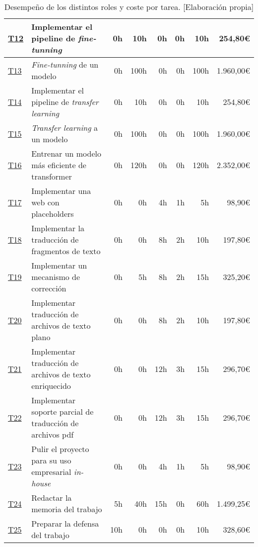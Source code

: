 \begin{landscape}
\begin{table}
\begin{tabular}{  l  l  r  r  r  r  r  r  }
        \hline
        \hyperref[T12]{T12} & Implementar el pipeline de \textit{fine-tunning} & 0h & 10h & 0h & 0h & 10h & 254,80\euro\\
        \hline
        \hyperref[T13]{T13} & \textit{Fine-tunning} de un modelo & 0h & 100h & 0h & 0h & 100h & 1.960,00\euro\\
        \hline
        \hyperref[T14]{T14} & Implementar el pipeline de \textit{transfer learning} & 0h & 10h & 0h & 0h & 10h & 254,80\euro\\
        \hline
        \hyperref[T15]{T15} & \textit{Transfer learning} a un modelo & 0h & 100h & 0h & 0h & 100h & 1.960,00\euro\\
        \hline
        \hyperref[T16]{T16} & Entrenar un modelo más eficiente de transformer & 0h & 120h & 0h & 0h & 120h & 2.352,00\euro\\
        \hline
        \hyperref[T17]{T17} & Implementar una web con placeholders & 0h & 0h & 4h & 1h & 5h & 98,90\euro\\
        \hline
        \hyperref[T18]{T18} & Implementar la traducción de fragmentos de texto & 0h & 0h & 8h & 2h & 10h & 197,80\euro\\
        \hline
        \hyperref[T19]{T19} & Implementar un mecanismo de corrección & 0h & 5h & 8h & 2h & 15h & 325,20\euro\\
        \hline
        \hyperref[T20]{T20} & Implementar traducción de archivos de texto plano & 0h & 0h & 8h & 2h & 10h & 197,80\euro\\
        \hline
        \hyperref[T21]{T21} & Implementar traducción de archivos de texto enriquecido & 0h & 0h & 12h & 3h & 15h & 296,70\euro\\
        \hline
        \hyperref[T22]{T22} & Implementar soporte parcial de traducción de archivos pdf & 0h & 0h & 12h & 3h & 15h & 296,70\euro\\
        \hline
        \hyperref[T23]{T23} & Pulir el proyecto para su uso empresarial \textit{in-house} & 0h & 0h & 4h & 1h & 5h & 98,90\euro\\
        \hline
        \hyperref[T24]{T24} & Redactar la memoria del trabajo & 5h & 40h & 15h & 0h & 60h & 1.499,25\euro\\
        \hline
        \hyperref[T25]{T25} & Preparar la defensa del trabajo & 10h & 0h & 0h & 0h & 10h & 328,60\euro\\
        \hline
    \end{tabular}
    \caption{Desempeño de los distintos roles y coste por tarea. [Elaboración propia]}\label{taskroledecompos}
    \end{table}
\end{landscape}
\restoregeometry


